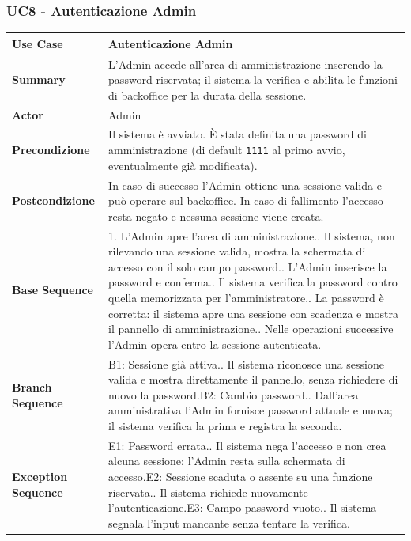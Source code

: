 \newpage 

\subsubsection*{UC8 - Autenticazione Admin}
\begin{center}
\begin{tabular}{|p{}|p{}|}
\hline
\textbf{Use Case} & Autenticazione Admin \\ \hline
\textbf{Summary} & L'Admin accede all'area di amministrazione inserendo la password riservata; il sistema la verifica e abilita le funzioni di backoffice per la durata della sessione. \\ \hline
\textbf{Actor} & Admin \\ \hline
\textbf{Precondizione} & Il sistema è avviato. È stata definita una password di amministrazione (di default \texttt{1111} al primo avvio, eventualmente già modificata). \\ \hline
\textbf{Postcondizione} & In caso di successo l'Admin ottiene una sessione valida e può operare sul backoffice. In caso di fallimento l'accesso resta negato e nessuna sessione viene creata. \\ \hline
\textbf{Base Sequence} & 1. L'Admin apre l'area di amministrazione.\newline 2. Il sistema, non rilevando una sessione valida, mostra la schermata di accesso con il solo campo password.\newline 3. L'Admin inserisce la password e conferma.\newline 4. Il sistema verifica la password contro quella memorizzata per l'amministratore.\newline 5. La password è corretta: il sistema apre una sessione con scadenza e mostra il pannello di amministrazione.\newline 6. Nelle operazioni successive l'Admin opera entro la sessione autenticata. \\ \hline
\textbf{Branch Sequence} & B1: Sessione già attiva.\newline 2. Il sistema riconosce una sessione valida e mostra direttamente il pannello, senza richiedere di nuovo la password.\newline B2: Cambio password.\newline 5. Dall'area amministrativa l'Admin fornisce password attuale e nuova; il sistema verifica la prima e registra la seconda. \\ \hline
\textbf{Exception Sequence} & E1: Password errata.\newline 4. Il sistema nega l'accesso e non crea alcuna sessione; l'Admin resta sulla schermata di accesso.\newline E2: Sessione scaduta o assente su una funzione riservata.\newline 6. Il sistema richiede nuovamente l'autenticazione.\newline E3: Campo password vuoto.\newline 3. Il sistema segnala l'input mancante senza tentare la verifica. \\ \hline

\end{tabular}
\end{center}
